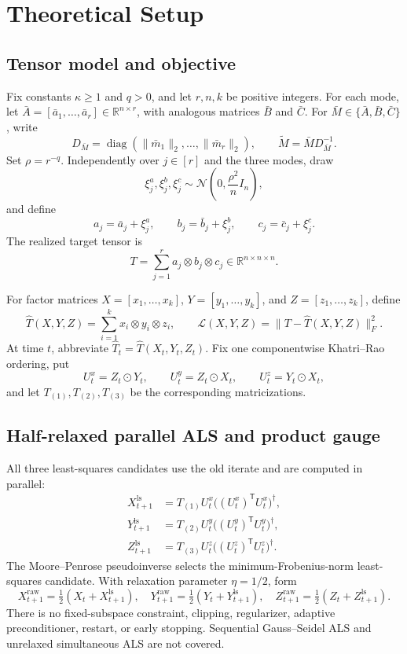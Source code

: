 \section{Theoretical Setup}\label{sec:setup}

\subsection{Tensor model and objective}

Fix constants $\kappa\geq 1$ and $q>0$, and let $r,n,k$ be positive
integers.  For each mode, let
$\bar A=[\bar a_1,\ldots,\bar a_r]\in\mathbb R^{n\times r}$, with
analogous matrices $\bar B$ and $\bar C$.  For
$\bar M\in\{\bar A,\bar B,\bar C\}$, write
\[
D_{\bar M}=\operatorname{diag}(\|\bar m_1\|_2,\ldots,
\|\bar m_r\|_2),
\qquad
\widetilde M=\bar M D_{\bar M}^{-1}.
\]
Set $\rho=r^{-q}$.  Independently over $j\in[r]$ and the three modes,
draw
\[
\xi_j^a,\xi_j^b,\xi_j^c
\sim \mathcal N\!\left(0,\frac{\rho^2}{n}I_n\right),
\]
and define
\[
a_j=\bar a_j+\xi_j^a,
\qquad b_j=\bar b_j+\xi_j^b,
\qquad c_j=\bar c_j+\xi_j^c.
\]
The realized target tensor is
\[
T=\sum_{j=1}^r a_j\otimes b_j\otimes c_j
\in\mathbb R^{n\times n\times n}.
\]

For factor matrices $X=[x_1,\ldots,x_k]$, $Y=[y_1,\ldots,y_k]$, and
$Z=[z_1,\ldots,z_k]$, define
\[
\widehat T(X,Y,Z)=\sum_{i=1}^k x_i\otimes y_i\otimes z_i,
\qquad
\mathcal L(X,Y,Z)=\|T-\widehat T(X,Y,Z)\|_F^2.
\]
At time $t$, abbreviate
$\widehat T_t=\widehat T(X_t,Y_t,Z_t)$.  Fix one componentwise
Khatri--Rao ordering, put
\[
U_t^x=Z_t\odot Y_t,
\qquad U_t^y=Z_t\odot X_t,
\qquad U_t^z=Y_t\odot X_t,
\]
and let $T_{(1)},T_{(2)},T_{(3)}$ be the corresponding matricizations.

\subsection{Half-relaxed parallel ALS and product gauge}

All three least-squares candidates use the old iterate and are computed in
parallel:
\[
\begin{aligned}
X_{t+1}^{\mathrm{ls}}
 &=T_{(1)}U_t^x\big((U_t^x)^{\mathsf T}U_t^x\big)^\dagger,\\
Y_{t+1}^{\mathrm{ls}}
 &=T_{(2)}U_t^y\big((U_t^y)^{\mathsf T}U_t^y\big)^\dagger,\\
Z_{t+1}^{\mathrm{ls}}
 &=T_{(3)}U_t^z\big((U_t^z)^{\mathsf T}U_t^z\big)^\dagger.
\end{aligned}
\]
The Moore--Penrose pseudoinverse selects the minimum-Frobenius-norm
least-squares candidate.  With relaxation parameter $\eta=1/2$, form
\[
X_{t+1}^{\mathrm{raw}}=\tfrac12(X_t+X_{t+1}^{\mathrm{ls}}),
\quad
Y_{t+1}^{\mathrm{raw}}=\tfrac12(Y_t+Y_{t+1}^{\mathrm{ls}}),
\quad
Z_{t+1}^{\mathrm{raw}}=\tfrac12(Z_t+Z_{t+1}^{\mathrm{ls}}).
\]
There is no fixed-subspace constraint, clipping, regularizer, adaptive
preconditioner, restart, or early stopping.  Sequential Gauss--Seidel ALS
and unrelaxed simultaneous ALS are not covered.

